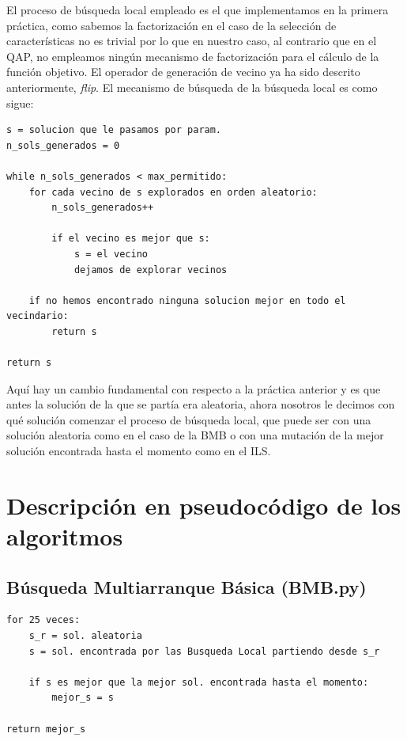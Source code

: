 \documentclass[10pt,a4paper]{article}
\begin{document}
El proceso de búsqueda local empleado es el que implementamos en la primera práctica, como sabemos la factorización en el caso de la selección de características no es trivial por lo que en nuestro caso, al contrario que en el QAP, no empleamos ningún mecanismo de factorización para el cálculo de la función objetivo. El operador de generación de vecino ya ha sido descrito anteriormente, \textit{flip}. El mecanismo de búsqueda de la búsqueda local es como sigue:\\

\begin{lstlisting}
s = solucion que le pasamos por param.
n_sols_generados = 0

while n_sols_generados < max_permitido:
	for cada vecino de s explorados en orden aleatorio:
		n_sols_generados++
		
		if el vecino es mejor que s:
			s = el vecino
			dejamos de explorar vecinos
					
	if no hemos encontrado ninguna solucion mejor en todo el vecindario:
		return s
		
return s
\end{lstlisting}

Aquí hay un cambio fundamental con respecto a la práctica anterior y es que antes la solución de la que se partía era aleatoria, ahora nosotros le decimos con qué solución comenzar el proceso de búsqueda local, que puede ser con una solución aleatoria como en el caso de la BMB o con una mutación de la mejor solución encontrada hasta el momento como en el ILS.\\

\newpage

\section{\color[rgb]{0.0,0.0,0.21}Descripción en pseudocódigo de los algoritmos}
\subsection{\color[rgb]{0.0,0.0,0.51}Búsqueda Multiarranque Básica (BMB.py)}

\begin{lstlisting}
for 25 veces:
	s_r = sol. aleatoria
	s = sol. encontrada por las Busqueda Local partiendo desde s_r
	
	if s es mejor que la mejor sol. encontrada hasta el momento:
		mejor_s = s
		
return mejor_s
\end{lstlisting}
\end{document}
